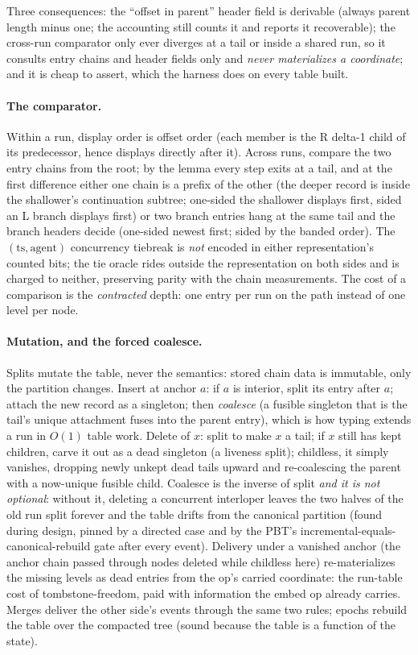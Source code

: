 \documentclass[11pt]{article}
\begin{document}
\noindent Three consequences: the
``offset in parent'' header field is derivable (always parent length
minus one; the accounting still counts it and reports it recoverable);
the cross-run comparator only ever diverges at a tail or inside a
shared run, so it consults entry chains and header fields only and
\emph{never materializes a coordinate}; and it is cheap to assert,
which the harness does on every table built.

\paragraph{The comparator.} Within a run, display order is offset
order (each member is the R delta-1 child of its predecessor, hence
displays directly after it). Across runs, compare the two entry chains
from the root; by the lemma every step exits at a tail, and at the
first difference either one chain is a prefix of the other (the deeper
record is inside the shallower's continuation subtree; one-sided the
shallower displays first, sided an L branch displays first) or two
branch entries hang at the same tail and the branch headers decide
(one-sided newest first; sided by the banded order). The
$(\mathrm{ts}, \mathrm{agent})$ concurrency tiebreak is \emph{not}
encoded in either representation's counted bits; the tie oracle rides
outside the representation on both sides and is charged to neither,
preserving parity with the chain measurements. The cost of a comparison
is the \emph{contracted} depth: one entry per run on the path instead
of one level per node.

\paragraph{Mutation, and the forced coalesce.} Splits mutate the table,
never the semantics: stored chain data is immutable, only the partition
changes. Insert at anchor $a$: if $a$ is interior, split its entry
after $a$; attach the new record as a singleton; then \emph{coalesce}
(a fusible singleton that is the tail's unique attachment fuses into
the parent entry), which is how typing extends a run in $O(1)$ table
work. Delete of $x$: split to make $x$ a tail; if $x$ still has kept
children, carve it out as a dead singleton (a liveness split);
childless, it simply vanishes, dropping newly unkept dead tails upward
and re-coalescing the parent with a now-unique fusible child. Coalesce
is the inverse of split \emph{and it is not optional}: without it,
deleting a concurrent interloper leaves the two halves of the old run
split forever and the table drifts from the canonical partition (found
during design, pinned by a directed case and by the PBT's
incremental-equals-canonical-rebuild gate after every event). Delivery
under a vanished anchor (the anchor chain passed through nodes deleted
while childless here) re-materializes the missing levels as dead
entries from the op's carried coordinate: the run-table cost of
tombstone-freedom, paid with information the embed op already carries.
Merges deliver the other side's events through the same two rules;
epochs rebuild the table over the compacted tree (sound because the
table is a function of the state).
\end{document}
